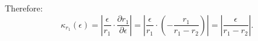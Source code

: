 \documentclass[reqno, answers]{exam}
\begin{document}
\begin{questions}
\begin{solution}
    Therefore:
    $$\kappa_{r_1}(\epsilon) = \left|\frac{\epsilon}{r_1} \cdot \frac{\partial r_1}{\partial \epsilon}\right| = \left|\frac{\epsilon}{r_1} \cdot \left(-\frac{r_1}{r_1-r_2}\right)\right| = \left|\frac{\epsilon}{r_1-r_2}\right|.$$
  \end{solution}


\end{questions}
\end{document}
